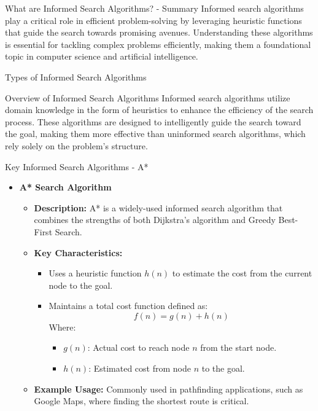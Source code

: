 \documentclass[aspectratio=169]{beamer}
\begin{document}
\begin{frame}[fragile]{What are Informed Search Algorithms? - Summary}
    Informed search algorithms play a critical role in efficient problem-solving by leveraging heuristic functions that guide the search towards promising avenues. Understanding these algorithms is essential for tackling complex problems efficiently, making them a foundational topic in computer science and artificial intelligence.
\end{frame}

\begin{frame}[fragile]{Types of Informed Search Algorithms}
    \begin{block}{Overview of Informed Search Algorithms}
        Informed search algorithms utilize domain knowledge in the form of heuristics to enhance the efficiency of the search process. 
        These algorithms are designed to intelligently guide the search toward the goal, making them more effective than uninformed search algorithms, which rely solely on the problem's structure.
    \end{block}
\end{frame}

\begin{frame}[fragile]{Key Informed Search Algorithms - A*}
    \begin{itemize}
        \item \textbf{A* Search Algorithm}
        \begin{itemize}
            \item \textbf{Description:} A* is a widely-used informed search algorithm that combines the strengths of both Dijkstra's algorithm and Greedy Best-First Search.
            \item \textbf{Key Characteristics:}
            \begin{itemize}
                \item Uses a heuristic function \( h(n) \) to estimate the cost from the current node to the goal.
                \item Maintains a total cost function defined as:
                \begin{equation}
                    f(n) = g(n) + h(n)
                \end{equation}
                Where:
                \begin{itemize}
                    \item \( g(n) \): Actual cost to reach node \( n \) from the start node.
                    \item \( h(n) \): Estimated cost from node \( n \) to the goal.
                \end{itemize}
            \end{itemize}
            \item \textbf{Example Usage:} Commonly used in pathfinding applications, such as Google Maps, where finding the shortest route is critical.
        \end{itemize}
    \end{itemize}
\end{frame}
\end{document}
